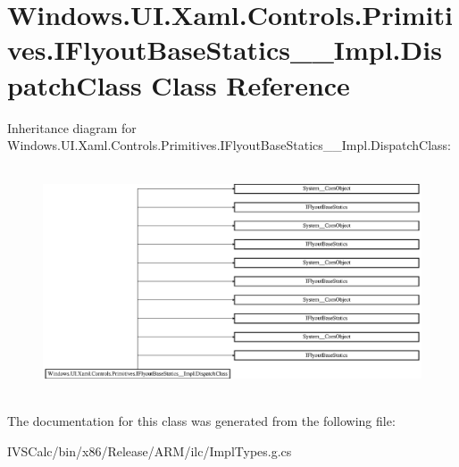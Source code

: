 \hypertarget{class_windows_1_1_u_i_1_1_xaml_1_1_controls_1_1_primitives_1_1_i_flyout_base_statics_____impl_1_1_dispatch_class}{}\section{Windows.\+U\+I.\+Xaml.\+Controls.\+Primitives.\+I\+Flyout\+Base\+Statics\+\_\+\+\_\+\+Impl.\+Dispatch\+Class Class Reference}
\label{class_windows_1_1_u_i_1_1_xaml_1_1_controls_1_1_primitives_1_1_i_flyout_base_statics_____impl_1_1_dispatch_class}
Inheritance diagram for Windows.\+U\+I.\+Xaml.\+Controls.\+Primitives.\+I\+Flyout\+Base\+Statics\+\_\+\+\_\+\+Impl.\+Dispatch\+Class\+:\begin{figure}[H]
\begin{center}
\leavevmode
\includegraphics[height=6.799117cm]{class_windows_1_1_u_i_1_1_xaml_1_1_controls_1_1_primitives_1_1_i_flyout_base_statics_____impl_1_1_dispatch_class}
\end{center}
\end{figure}


The documentation for this class was generated from the following file\+:\begin{DoxyCompactItemize}
\item 
I\+V\+S\+Calc/bin/x86/\+Release/\+A\+R\+M/ilc/Impl\+Types.\+g.\+cs\end{DoxyCompactItemize}
